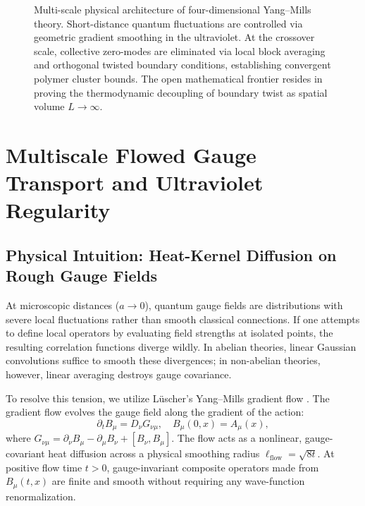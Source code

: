 \documentclass[11pt,a4paper]{article}
\theoremstyle{definition}
\theoremstyle{remark}
\newcommand{\flow}{\mathrm{flow}}
\begin{document}
\begin{figure}[htbp]
\caption{Multi-scale physical architecture of four-dimensional Yang--Mills theory. Short-distance quantum fluctuations are controlled via geometric gradient smoothing in the ultraviolet. At the crossover scale, collective zero-modes are eliminated via local block averaging and orthogonal twisted boundary conditions, establishing convergent polymer cluster bounds. The open mathematical frontier resides in proving the thermodynamic decoupling of boundary twist as spatial volume $L \to \infty$.}
\label{fig:multiscale_architecture}
\end{figure}

\section{Multiscale Flowed Gauge Transport and Ultraviolet Regularity}

\subsection{Physical Intuition: Heat-Kernel Diffusion on Rough Gauge Fields}
At microscopic distances ($a \to 0$), quantum gauge fields are distributions with severe local fluctuations rather than smooth classical connections. If one attempts to define local operators by evaluating field strengths at isolated points, the resulting correlation functions diverge wildly. In abelian theories, linear Gaussian convolutions suffice to smooth these divergences; in non-abelian theories, however, linear averaging destroys gauge covariance.

To resolve this tension, we utilize L\"uscher's Yang--Mills gradient flow \cite{Luscher2010JHEP}. The gradient flow evolves the gauge field along the gradient of the action:
\begin{equation}
\partial_t B_\mu = D_\nu G_{\nu\mu}, \quad B_\mu(0, x) = A_\mu(x),
\end{equation}
where $G_{\nu\mu} = \partial_\nu B_\mu - \partial_\mu B_\nu + [B_\nu, B_\mu]$. The flow acts as a nonlinear, gauge-covariant heat diffusion across a physical smoothing radius $\ell_{\flow} = \sqrt{8t}$. At positive flow time $t > 0$, gauge-invariant composite operators made from $B_\mu(t, x)$ are finite and smooth without requiring any wave-function renormalization.
\end{document}

